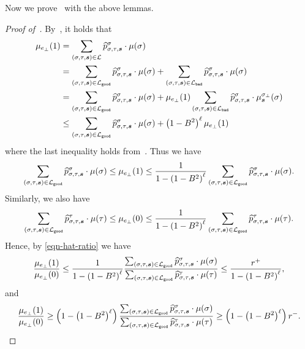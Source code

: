 \documentclass[11pt]{article}
\def\!#1{\mathtt{#1}}
\def\bad{\!{bad}}
\def\good{\!{good}}
\newcommand{\wh}[1]{\widehat{#1}}
\newcommand{\seqS}{\boldsymbol{s}}
\begin{document}
Now we prove~ with the above lemmas.
\begin{proof}[Proof of~]
    By~, it holds that
    \begin{align*}
        \mu_{e_\bot}(1) &= \sum_{(\sigma, \tau, \seqS) \in \+L} \wh{p}_{\sigma, \tau, \seqS}^{\sigma} \cdot \mu(\sigma) \\
        &= \sum_{(\sigma, \tau, \seqS) \in \+L_{\good}} \wh{p}_{\sigma, \tau, \seqS}^{\sigma} \cdot  \mu(\sigma) + \sum_{(\sigma, \tau, \seqS) \in \+L_{\bad}} \wh{p}_{\sigma, \tau, \seqS}^{\sigma} \cdot  \mu(\sigma) \\
        &= \sum_{(\sigma, \tau, \seqS) \in \+L_{\good}} \wh{p}_{\sigma, \tau, \seqS}^{\sigma} \cdot \mu(\sigma) + \mu_{e_\bot}(1) \sum_{(\sigma, \tau, \seqS) \in \+L_{\bad}} \wh{p}_{\sigma, \tau, \seqS}^{\sigma} \cdot \mu_{\seqS}^{\sigma_{\bot}}(\sigma)\\
        &\le \sum_{(\sigma, \tau, \seqS) \in \+L_{\good}} \wh{p}_{\sigma, \tau, \seqS}^{\sigma} \cdot \mu(\sigma) + \left(1 - B^2\right)^{\ell} \mu_{e_\bot}(1)
    \end{align*}
    where the last inequality holds from~. Thus we have
    $$
        \sum_{(\sigma, \tau, \seqS) \in \+L_{\good}} \wh{p}_{\sigma, \tau, \seqS}^{\sigma} \cdot \mu(\sigma) \le \mu_{e_\bot}(1) \le \frac{1}{1 - \left(1 - B^2\right)^{\ell}} \sum_{(\sigma, \tau, \seqS) \in \+L_{\good}} \wh{p}_{\sigma, \tau, \seqS}^{\sigma} \cdot \mu(\sigma).
    $$
    Similarly, we also have
    $$
        \sum_{(\sigma, \tau, \seqS) \in \+L_{\good}} \wh{p}_{\sigma, \tau, \seqS}^{\tau} \cdot\mu(\tau)\le \mu_{e_\bot}(0) \le \frac{1}{1 - \left(1 - B^2\right)^{\ell}} \sum_{(\sigma, \tau, \seqS) \in \+L_{\good}} \wh{p}_{\sigma, \tau, \seqS}^{\tau} \cdot \mu(\tau).
    $$
    Hence, by \eqref{eqn-hat-ratio} we have
    \begin{align*}
        \frac{\mu_{e_\bot}(1)}{\mu_{e_\bot}(0)} \le \frac{1}{1 - \left(1 - B^2\right)^{\ell}} \frac{\sum_{(\sigma, \tau, \seqS) \in \+L_{\good}} \wh{p}_{\sigma, \tau, \seqS}^{\sigma} \cdot \mu(\sigma)}{\sum_{(\sigma, \tau, \seqS) \in \+L_{\good}} \wh{p}_{\sigma, \tau, \seqS}^{\tau} \cdot \mu(\tau)} 
        \le \frac{r^+}{1 - \left(1 - B^2\right)^{\ell}},
    \end{align*}
    and
    \begin{align*}
       \frac{\mu_{e_\bot}(1)}{\mu_{e_\bot}(0)} \ge \left(1 - \left(1 - B^2\right)^{\ell}\right) \frac{\sum_{(\sigma, \tau, \seqS) \in \+L_{\good}} \wh{p}_{\sigma, \tau, \seqS}^{\sigma} \cdot \mu(\sigma)}{\sum_{(\sigma, \tau, \seqS) \in \+L_{\good}} \wh{p}_{\sigma, \tau, \seqS}^{\tau} \cdot \mu(\tau)} 
        \ge \left(1 - \left(1 - B^2\right)^{\ell}\right) r^-.
    \end{align*}
\end{proof}
\end{document}
